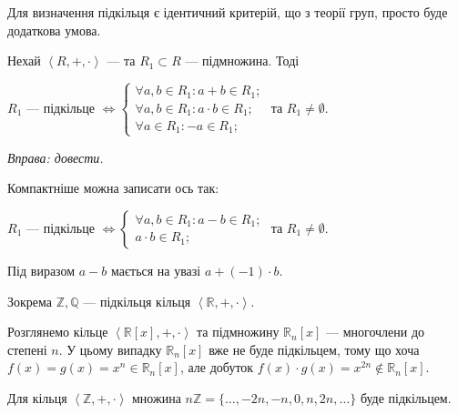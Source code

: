 \documentclass{math_library}
\begin{document}
Для визначення підкільця є ідентичний критерій, що з теорії груп, просто буде додаткова умова.

\begin{theorem}
\label{subring_criterion}
Нехай $\left<R,+, \cdot \right>$ --- та $R_1 \subset R$ --- підмножина. Тоді
\begin{center}
$R_1$ --- підкільце $\iff \begin{cases} \forall a,b \in R_1: a+b \in R_1; \\ \forall a,b \in R_1: a \cdot b \in R_1; \\ \forall a \in R_1: -a \in R_1; \end{cases}$ та $R_1 \neq \emptyset$.
\end{center}
\textit{Вправа: довести.}
\end{theorem}

\begin{corollary}
Компактніше можна записати ось так:
\begin{center}
$R_1$ --- підкільце $\iff \begin{cases} \forall a,b \in R_1: a-b \in R_1; \\ a \cdot b \in R_1; \end{cases}$ та $R_1 \neq \emptyset$.
\end{center}
\end{corollary}

\begin{remark}
Під виразом $a-b$ мається на увазі $a + (-1) \cdot b$.
\end{remark}

\begin{example}
Зокрема $\mathbb{Z}, \mathbb{Q}$ --- підкільця кільця $\left< \mathbb{R},+,\cdot \right>$.
\end{example}

\begin{example}
Розглянемо кільце $\left<\mathbb{R}[x], +, \cdot \right>$ та 
підмножину $\mathbb{R}_n[x]$ --- многочлени до степені $n$. У цьому випадку $\mathbb{R}_n[x]$ вже не буде підкільцем, тому що хоча $f(x) = g(x) = x^n \in \mathbb{R}_n[x]$, але добуток $f(x) \cdot g(x) = x^{2n} \not \in \mathbb{R}_n[x]$.
\end{example}

\begin{example}
Для кільця $\left<\mathbb{Z},+,\cdot \right>$ множина $n\mathbb{Z} = \{\dots,-2n,-n,0,n,2n,\dots\}$ буде підкільцем.
\end{example}
\end{document}
